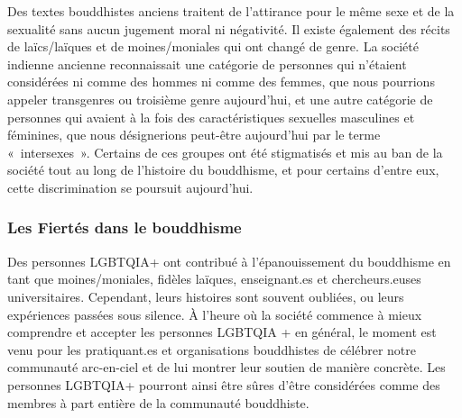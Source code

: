 \documentclass[12pt,openany]{book}
\begin{document}
Des textes bouddhistes anciens traitent de l’attirance pour le même sexe et de la sexualité sans aucun jugement moral ni négativité. Il existe également des récits de laïcs/laïques et de moines/moniales qui ont changé de genre. La société indienne ancienne reconnaissait une catégorie de personnes qui n’étaient considérées ni comme des hommes ni comme des femmes, que nous pourrions appeler transgenres ou troisième genre aujourd’hui, et une autre catégorie de personnes qui avaient à la fois des caractéristiques sexuelles masculines et féminines, que nous désignerions peut-être aujourd’hui par le terme \mbox{« intersexes »}. Certains de ces groupes ont été stigmatisés et mis au ban de la société tout au long de l’histoire du bouddhisme, et pour certains d’entre eux, cette discrimination se poursuit aujourd’hui.

\subsubsection*{Les Fiertés dans le bouddhisme}

\noindent Des personnes \mbox{LGBTQIA+} ont contribué à l’épanouissement du bouddhisme en tant que moines/moniales, fidèles laïques, enseignant.es et chercheurs.euses universitaires.
Cependant, leurs histoires sont souvent oubliées, ou leurs expériences passées sous silence.
À l’heure où la société commence à mieux comprendre et accepter les personnes LGBTQIA + en général, le moment est venu pour les pratiquant.es et organisations bouddhistes de célébrer notre communauté arc-en-ciel et de lui montrer leur soutien de manière concrète.
Les personnes \mbox{LGBTQIA+} pourront ainsi être sûres d’être considérées comme des membres à part entière de la communauté bouddhiste.

\begingroup
\begin{figure}[h]
    \centering
\end{figure}
\end{document}
